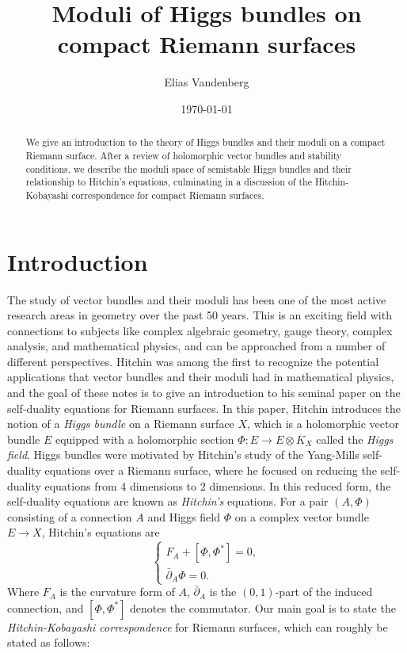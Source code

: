 \documentclass[10pt]{amsart}
\numberwithin{equation}{section}
\theoremstyle{plain}
\theoremstyle{definition}
\theoremstyle{remark}
\begin{document}
\title{Moduli of Higgs bundles on compact Riemann surfaces}
\begin{abstract}
We give an introduction to the theory of Higgs bundles and their moduli on a compact Riemann surface. After a review of holomorphic vector bundles and stability conditions, we describe the moduli space of semistable Higgs bundles and their relationship to Hitchin's equations, culminating in a discussion of the Hitchin-Kobayashi correspondence for compact Riemann surfaces.
\end{abstract}

\author{Elias Vandenberg}
\address{Department of Mathematics, Western University}
\date{\today}

\maketitle

\tableofcontents

\section{Introduction} 

The study of vector bundles and their moduli has been one of the most active research areas in geometry over the past 50 years. This is an exciting field with connections to subjects like complex algebraic geometry, gauge theory, complex analysis, and mathematical physics, and can be approached from a number of different perspectives. Hitchin was among the first to recognize the potential applications that vector bundles and their moduli had in mathematical physics, and the goal of these notes is to give an introduction to his seminal paper \cite{hitchin1987A} on the self-duality equations for Riemann surfaces. In this paper, Hitchin introduces the notion of a \emph{Higgs bundle} on a Riemann surface $X$, which is a holomorphic vector bundle $E$ equipped with a holomorphic section $\Phi: E \to E \otimes K_X$ called the \emph{Higgs field}. Higgs bundles were motivated by Hitchin's study of the Yang-Mills self-duality equations over a Riemann surface, where he focused on reducing the self-duality equations from 4 dimensions to 2 dimensions. In this reduced form, the self-duality equations are known as \emph{Hitchin's} equations. For a pair $(A, \Phi)$ consisting of a connection $A$ and Higgs field $\Phi$ on a complex vector bundle $E \to X$, Hitchin's equations are
\[\begin{cases}
F_A + [\Phi, \Phi^*] = 0, \\ 
\bar{\partial}_A \Phi = 0.
\end{cases}
\]
Where $F_A$ is the curvature form of $A$, $\bar{\partial}_A$ is the $(0,1)$-part of the induced connection, and $[\Phi, \Phi^*]$ denotes the commutator. Our main goal is to state the \emph{Hitchin-Kobayashi correspondence} for Riemann surfaces, which can roughly be stated as follows:
\end{document}
